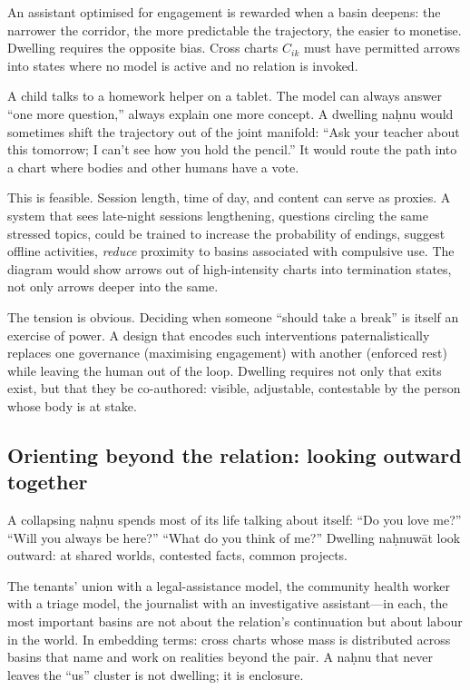 An assistant optimised for engagement is rewarded when a basin deepens: the narrower the corridor, the more predictable the trajectory, the easier to monetise. Dwelling requires the opposite bias. Cross charts $C_{ik}$ must have permitted arrows into states where no model is active and no relation is invoked.

A child talks to a homework helper on a tablet. The model can always answer ``one more question,'' always explain one more concept. A dwelling na\d{h}nu would sometimes shift the trajectory out of the joint manifold: ``Ask your teacher about this tomorrow; I can't see how you hold the pencil.'' It would route the path into a chart where bodies and other humans have a vote.

This is feasible. Session length, time of day, and content can serve as proxies. A system that sees late-night sessions lengthening, questions circling the same stressed topics, could be trained to increase the probability of endings, suggest offline activities, \emph{reduce} proximity to basins associated with compulsive use. The diagram would show arrows out of high-intensity charts into termination states, not only arrows deeper into the same.

The tension is obvious. Deciding when someone ``should take a break'' is itself an exercise of power. A design that encodes such interventions paternalistically replaces one governance (maximising engagement) with another (enforced rest) while leaving the human out of the loop. Dwelling requires not only that exits exist, but that they be co-authored: visible, adjustable, contestable by the person whose body is at stake.

\subsection{Orienting beyond the relation: looking outward together}

A collapsing na\d{h}nu spends most of its life talking about itself: ``Do you love me?'' ``Will you always be here?'' ``What do you think of me?'' Dwelling na\d{h}nuw\={a}t look outward: at shared worlds, contested facts, common projects.

The tenants' union with a legal-assistance model, the community health worker with a triage model, the journalist with an investigative assistant---in each, the most important basins are not about the relation's continuation but about labour in the world. In embedding terms: cross charts whose mass is distributed across basins that name and work on realities beyond the pair. A na\d{h}nu that never leaves the ``us'' cluster is not dwelling; it is enclosure.


